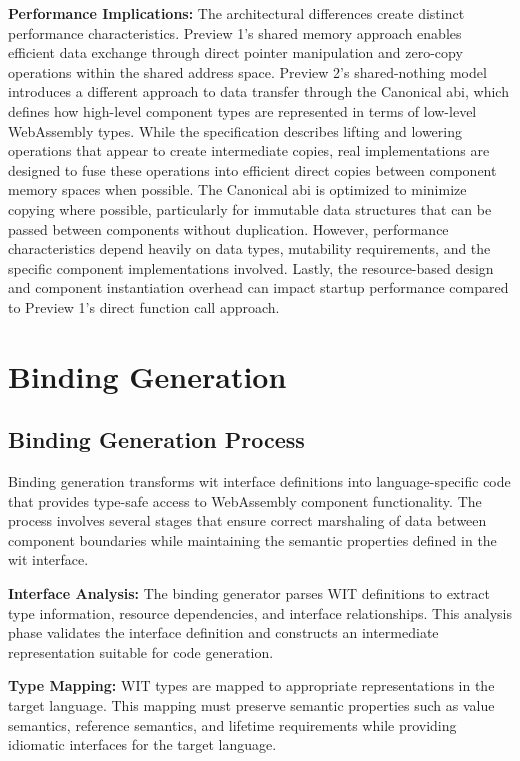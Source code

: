 \textbf{Performance Implications:} The architectural differences create distinct performance characteristics. Preview 1's shared memory approach enables efficient data exchange through direct pointer manipulation and zero-copy operations within the shared address space. Preview 2's shared-nothing model introduces a different approach to data transfer through the Canonical \acrshort{abi}, which defines how high-level component types are represented in terms of low-level WebAssembly types. While the specification describes lifting and lowering operations that appear to create intermediate copies, real implementations are designed to fuse these operations into efficient direct copies between component memory spaces when possible. The Canonical \acrshort{abi} is optimized to minimize copying where possible, particularly for immutable data structures that can be passed between components without duplication. However, performance characteristics depend heavily on data types, mutability requirements, and the specific component implementations involved. Lastly, the resource-based design and component instantiation overhead can impact startup performance compared to Preview 1's direct function call approach.

\section{Binding Generation}
\label{sec:wit-binding}

\subsection{Binding Generation Process}
\label{subsec:binding-generation}

Binding generation transforms \acrshort{wit} interface definitions into language-specific code that provides type-safe access to WebAssembly component functionality. The process involves several stages that ensure correct marshaling of data between component boundaries while maintaining the semantic properties defined in the \acrshort{wit} interface.

\textbf{Interface Analysis:} The binding generator parses WIT definitions to extract type information, resource dependencies, and interface relationships. This analysis phase validates the interface definition and constructs an intermediate representation suitable for code generation.

\textbf{Type Mapping:} WIT types are mapped to appropriate representations in the target language. This mapping must preserve semantic properties such as value semantics, reference semantics, and lifetime requirements while providing idiomatic interfaces for the target language.

